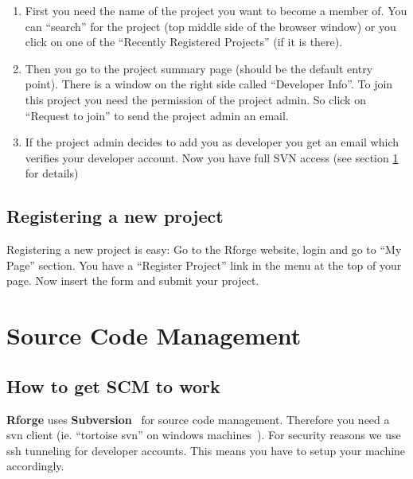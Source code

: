 \documentclass[a4paper]{article}
\begin{document}
\begin{enumerate}
\item First you need the name of the project you want to become a
  member of. You can ``search'' for the project (top middle side of the
  browser window) or you click on one of the ``Recently Registered
  Projects'' (if it is there).
\item Then you go to the project summary page (should be the default
  entry point). There is a window on the right side called
  ``Developer Info''. To join this project you need the permission of
  the project admin. So click on ``Request to join'' to send the
  project admin an email.
\item If the project admin decides to add you as developer you get an
  email which verifies your developer account. Now you have full SVN
  access (see section \ref{sec:scm} for details)
\end{enumerate}

\subsection{Registering a new project}
\label{sec:newproject}

Registering a new project is easy: Go to the Rforge website, login and
go to ``My Page'' section. You have a ``Register Project'' link in the
menu at the top of your page. Now insert the form and submit your
project.

\section{Source Code Management}
\label{sec:scm}

\subsection{How to get SCM to work}
\label{sec:scmhowto}
\textbf{Rforge} uses \textbf{Subversion}~\cite{subversion} for source code
management. Therefore you need a svn client (ie. ``tortoise svn'' on
windows machines~\cite{tortoisesvn}). For security reasons we use ssh tunneling for
developer accounts. This means you have to setup your machine
accordingly.
\end{document}
